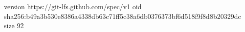 version https://git-lfs.github.com/spec/v1
oid sha256:b49a3b530e8386a4338db63c71ff5c38a6db0376373bf6d518f9f8d8b20329dc
size 92
